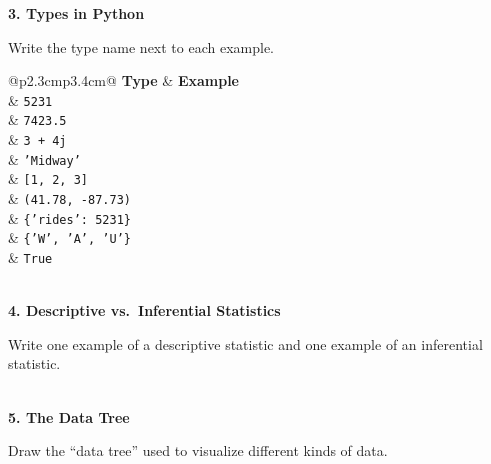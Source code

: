 \documentclass[11pt]{article}
\newcommand{\blankspace}[1]{%
  \vspace{0.3em}
  \begin{minipage}[t][#1][t]{\linewidth}
  \end{minipage}
  \vspace{0.3em}
}
\newcommand{\guidedopen}[4]{%
  \noindent\textbf{#1}\\[0.18em]
  \noindent
  \begin{minipage}[t]{0.485\textwidth}
    #2
    \blankspace{#3}
  \end{minipage}
  \hfill
  \begin{minipage}[t]{0.485\textwidth}
    \blankspace{#4}
  \end{minipage}
  \\[0.4em]
}
\begin{document}
\guidedopen{3. Types in Python}{
Write the type name next to each example.

\small
\begin{tabular}{@{}p{2.3cm}p{3.4cm}@{}}
\textbf{Type} & \textbf{Example} \\[0.35em]
\underline{\hspace{2.1cm}} & \texttt{5231} \\[0.18em]
\underline{\hspace{2.1cm}} & \texttt{7423.5} \\[0.18em]
\underline{\hspace{2.1cm}} & \texttt{3 + 4j} \\[0.18em]
\underline{\hspace{2.1cm}} & \texttt{'Midway'} \\[0.18em]
\underline{\hspace{2.1cm}} & \texttt{[1, 2, 3]} \\[0.18em]
\underline{\hspace{2.1cm}} & \texttt{(41.78, -87.73)} \\[0.18em]
\underline{\hspace{2.1cm}} & \texttt{\{'rides': 5231\}} \\[0.18em]
\underline{\hspace{2.1cm}} & \texttt{\{'W', 'A', 'U'\}} \\[0.18em]
\underline{\hspace{2.1cm}} & \texttt{True} \\
\end{tabular}
}{3.0cm}{4.5cm}

\guidedopen{4. Descriptive vs.\ Inferential Statistics}{
Write one example of a descriptive statistic and one example of an inferential statistic.
}{3.8cm}{5.5cm}

\guidedopen{5. The Data Tree}{
Draw the ``data tree'' used to visualize different kinds of data.
}{3.8cm}{5.1cm}

\vfill
\end{document}
